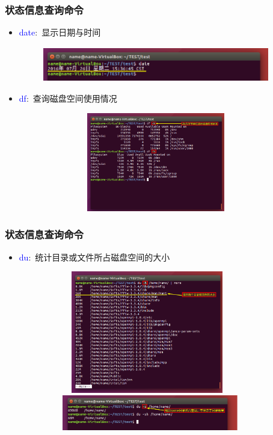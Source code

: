 \frame
{
	\frametitle{状态信息查询命令}
	\begin{itemize}
\setlength{\itemsep}{-10pt}
		\item \textcolor{blue}{date}:~显示日期与时间
\begin{figure}[h!]
\centering
\vspace{-15.5pt}
\includegraphics[height=0.6in,width=3.9in,viewport=0 0 800 130,clip]{Figures/Ubuntu-date.png}
\label{Linux-command-date}
\end{figure}
		\item \textcolor{blue}{df}:~查询磁盘空间使用情况
\begin{figure}[h!]
\centering
\vspace{-15.5pt}
\includegraphics[height=1.7in,width=3.9in,viewport=0 150 800 530,clip]{Figures/Ubuntu-df.png}
\label{Linux-command-df}
\end{figure}
\end{itemize}
}

\frame
{
	\frametitle{状态信息查询命令}
	\begin{itemize}
		\item \textcolor{blue}{du}:~统计目录或文件所占磁盘空间的大小
\begin{figure}[h!]
\centering
\vspace{-5.5pt}
\includegraphics[height=2.1in,width=3.6in,viewport=0 0 800 580,clip]{Figures/Ubuntu-du-1.png}
\includegraphics[height=0.6in,width=3.7in,viewport=0 0 880 150,clip]{Figures/Ubuntu-du-2.png}
\label{Linux-command-du}
\end{figure}
	\end{itemize}
}

